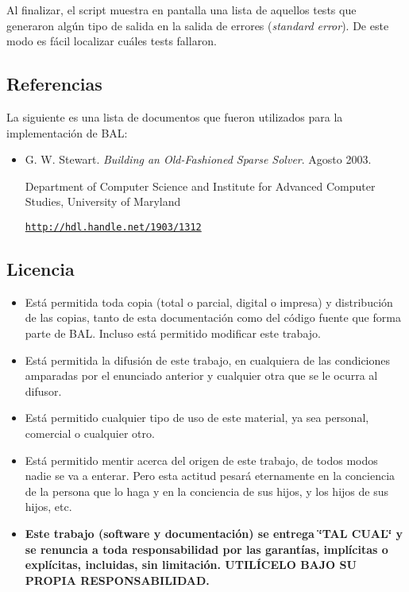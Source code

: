 Al finalizar, el script muestra en pantalla una lista de aquellos tests que generaron algún tipo de salida en la salida de errores ({\em standard error\/}). De este modo es fácil localizar cuáles tests fallaron.\hypertarget{index_refsec}{}\subsection{Referencias}\label{index_refsec}
La siguiente es una lista de documentos que fueron utilizados para la implementación de BAL: \begin{itemize}
\item G. W. Stewart. {\em Building an Old-Fashioned Sparse Solver\/}. Agosto 2003.\par
 Department of Computer Science and Institute for Advanced Computer Studies, University of Maryland\par
 \href{http://hdl.handle.net/1903/1312}{\tt http://hdl.handle.net/1903/1312} \end{itemize}
\hypertarget{index_licsec}{}\subsection{Licencia}\label{index_licsec}
\begin{itemize}
\item Está permitida toda copia (total o parcial, digital o impresa) y distribución de las copias, tanto de esta documentación como del código fuente que forma parte de BAL. Incluso está permitido modificar este trabajo. \item Está permitida la difusión de este trabajo, en cualquiera de las condiciones amparadas por el enunciado anterior y cualquier otra que se le ocurra al difusor. \item Está permitido cualquier tipo de uso de este material, ya sea personal, comercial o cualquier otro. \item Está permitido mentir acerca del origen de este trabajo, de todos modos nadie se va a enterar. Pero esta actitud pesará eternamente en la conciencia de la persona que lo haga y en la conciencia de sus hijos, y los hijos de sus hijos, etc. \item {\bf Este trabajo (software y documentación) se entrega \char`\"{}TAL CUAL\char`\"{} y se renuncia a toda responsabilidad por las garantías, implícitas o explícitas, incluidas, sin limitación. UTILÍCELO BAJO SU PROPIA RESPONSABILIDAD.} \end{itemize}
